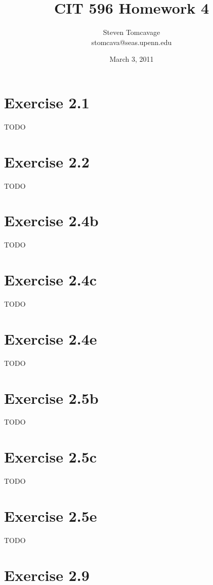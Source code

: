 \documentclass{article}
\title{CIT 596 Homework 4}
\author{Steven Tomcavage\\stomcava@seas.upenn.edu}
\date{March 3, 2011}
\begin{document}
\maketitle

\section{Exercise 2.1}

TODO

\section{Exercise 2.2}

TODO

\section{Exercise 2.4b}

TODO

\section{Exercise 2.4c}

TODO

\section{Exercise 2.4e}

TODO

\section{Exercise 2.5b}

TODO

\section{Exercise 2.5c}

TODO

\section{Exercise 2.5e}

TODO

\section{Exercise 2.9}
\end{document}

